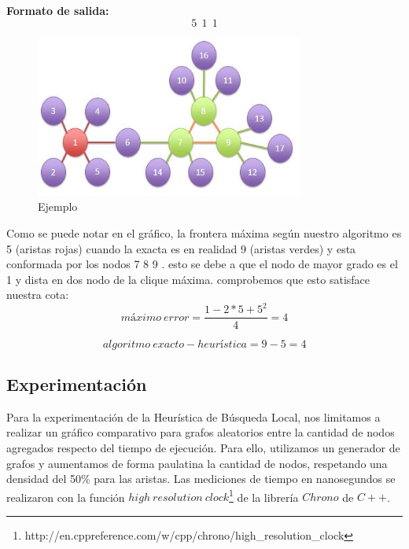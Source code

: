 \begin {itemize}
\textbf{Formato de salida:}
$$5\ \   1\ \   1$$
\begin{figure}[H] %
\begin{center}
\includegraphics[width=250pt]{../imgs/ej2local.jpg}
\caption{Ejemplo}
\end{center}
\end{figure}
Como se puede notar en el gráfico, la frontera máxima según nuestro algoritmo es 5 (aristas rojas) cuando la exacta es en realidad 9 (aristas verdes) y esta conformada por los nodos 7 8 9 . esto se debe a que el nodo de mayor grado es el 1 y dista en dos nodo de la clique máxima.
\newline
comprobemos que esto satisface nuestra cota:
\begin{equation}
  máximo\ error = \frac{1 - 2 * 5 + 5^{2}}{4} = 4
\end{equation}

\begin{equation}
  algoritmo\ exacto - heurística = 9 - 5 = 4
\end{equation}
\end{itemize}

\subsection{Experimentación}
Para la experimentación de la Heurística de Búsqueda Local, nos limitamos a realizar un gráfico comparativo para grafos aleatorios entre la cantidad de nodos agregados respecto del tiempo de ejecución. Para ello, utilizamos un generador de grafos y aumentamos de forma paulatina la cantidad de nodos, respetando una densidad del 50\% para las aristas.\newline
Las mediciones de tiempo en nanosegundos se realizaron con la función $high\ resolution\ clock$\footnote{http://en.cppreference.com/w/cpp/chrono/high\_resolution\_clock} de la librería $Chrono$ de $C++$. 

